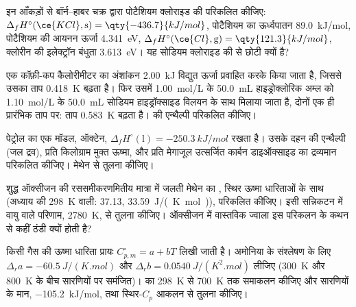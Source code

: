 \begin{exercise}[$\star\star$]\label{exo:b2:reaction-enthalpy:7}
इन आँकड़ों से बॉर्न--हाबर चक्र द्वारा पोटैशियम क्लोराइड की 
परिकलित कीजिए: $\Delta_f H^\circ(\ce{KCl}, \text{s}) = \qty{-436.7}{kJ/mol}$,
पोटैशियम का ऊर्ध्वपातन \qty{89.0}{kJ/mol}, पोटैशियम की आयनन ऊर्जा
\qty{4.341}{eV}, $\Delta_f H^\circ(\ce{Cl}, \text{g}) =
\qty{121.3}{kJ/mol}$, क्लोरीन की इलेक्ट्रॉन बंधुता \qty{3.613}{eV}। यह
सोडियम क्लोराइड की  से छोटी क्यों है?
\end{exercise}

\begin{exercise}[$\star\star$]\label{exo:b2:reaction-enthalpy:8}
एक कॉफ़ी-कप कैलोरीमीटर का अंशांकन \qty{2.00}{kJ} विद्युत ऊर्जा
प्रवाहित करके किया जाता है, जिससे उसका ताप \qty{0.418}{K} बढ़ता है। फिर
उसमें \qty{1.00}{mol/L} के \qty{50.0}{mL} हाइड्रोक्लोरिक अम्ल को
\qty{1.10}{mol/L} के \qty{50.0}{mL} सोडियम हाइड्रॉक्साइड विलयन के साथ मिलाया जाता है,
दोनों एक ही प्रारंभिक ताप पर: ताप \qty{0.583}{K} बढ़ता है।
 की एन्थैल्पी परिकलित कीजिए।
\end{exercise}

\begin{exercise}[$\star\star$]\label{exo:b2:reaction-enthalpy:9}
पेट्रोल का एक मॉडल, ऑक्टेन, $\Delta_f H^\circ(\text{l}) =
\qty{-250.3}{kJ/mol}$ रखता है। उसके दहन की एन्थैल्पी (जल
द्रव), प्रति किलोग्राम मुक्त ऊष्मा, और प्रति मेगाजूल उत्सर्जित कार्बन
डाइऑक्साइड का द्रव्यमान परिकलित कीजिए। मेथेन से तुलना कीजिए।
\end{exercise}

\begin{exercise}[$\star\star\star$]\label{exo:b2:reaction-enthalpy:10}
शुद्ध ऑक्सीजन की रससमीकरणमितीय मात्रा में जलती मेथेन का ,
स्थिर ऊष्मा धारिताओं के साथ (अध्याय की
\qty{298}{K} वाली:  37.13, 
\qty{33.59}{J/(K.mol)}), परिकलित कीजिए। इसी सन्निकटन में वायु वाले परिणाम,
\qty{2780}{K}, से तुलना कीजिए। ऑक्सीजन में वास्तविक ज्वाला इस
परिकलन के कथन से कहीं ठंडी क्यों होती है?
\end{exercise}

\begin{exercise}[$\star\star\star$]\label{exo:b2:reaction-enthalpy:11}
किसी गैस की ऊष्मा धारिता प्रायः $C_{p,m}^\circ = a + bT$ लिखी जाती है।
अमोनिया के संश्लेषण के लिए $\Delta_r a = \qty{-60.5}{J/(K.mol)}$ और
$\Delta_r b = \qty{0.0540}{J/(K^2.mol)}$ लीजिए (\qty{300}{K} और \qty{800}{K}
के बीच सारणियों पर समंजित)।  का
\qty{298}{K} से \qty{700}{K} तक समाकलन कीजिए और सारणियों के मान,
\qty{-105.2}{kJ/mol}, तथा स्थिर-$C_p$ आकलन से तुलना कीजिए।
\end{exercise}

